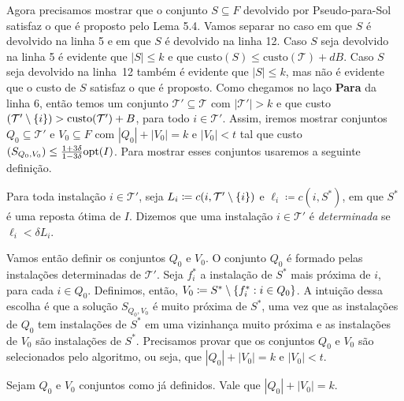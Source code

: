 Agora precisamos mostrar que o conjunto $S \subseteq F$ devolvido por {\sc Pseudo-para-Sol} satisfaz o que é proposto pelo Lema 5.4. Vamos separar no caso em que $S$ é devolvido na linha 5 e em que $S$ é devolvido na linha 12. Caso $S$ seja devolvido na linha 5 é evidente que $|S| \leq k$ e que custo$(S) \leq \text{custo}(\mathcal{T}) + dB$. Caso $S$ seja devolvido na linha~12 também é evidente que $|S| \leq k$, mas não é evidente que o custo de $S$ satisfaz o que é proposto. Como chegamos no laço {\bf Para} da linha 6, então temos um conjunto $\mathcal{T}' \subseteq \mathcal{T}$ com $|\mathcal{T}'| > k$ e que custo$(\mathcal{T}' \setminus \{i\}) > \text{custo}(\mathcal{T}') + B$, para todo $i \in \mathcal{T}'$.  Assim, iremos mostrar conjuntos $Q_0 \subseteq \mathcal{T}'$ e $V_0 \subseteq F$ com $|Q_0| + |V_0| = k$ e $|V_0| < t$ tal que custo$(S_{Q_0,V_0}) \leq \frac{1+3\delta}{1-3\delta}\mathrm{opt}(I)$.
Para mostrar esses conjuntos usaremos a seguinte definição.
\begin{definition}
    Para toda instalação $i \in \mathcal{T}'$, seja $L_i \coloneqq c(i,\mathcal{T}' \setminus \{i\})$ e $\ell_i \coloneqq c(i,S^*)$, em que $S^*$ é uma reposta ótima de $I$. Dizemos que uma instalação $i \in \mathcal{T}'$ é \emph{determinada} se $\ell_i < \delta L_i$.
\end{definition}
Vamos então definir os conjuntos $Q_0$ e $V_0$. O conjunto $Q_0$ é formado pelas instalações determinadas de $\mathcal{T}'$. Seja $f_i^*$ a instalação de $S^*$ mais próxima de $i$, para cada $i \in Q_0$. Definimos, então, $V_0 \coloneqq S^* \setminus \{f_i^* : i\in Q_0\}$. A intuição dessa escolha é que a solução $S_{Q_0,V_0}$ é muito próxima de $S^*$, uma vez que as instalações de $Q_0$ tem instalações de $S^*$ em uma vizinhança muito próxima e as instalações de $V_0$ são instalações de $S^*$. Precisamos provar que os conjuntos $Q_0$ e $V_0$ são selecionados pelo algoritmo, ou seja, que $|Q_0| + |V_0| = k$ e $|V_0| < t$.

\begin{lemma}
    Sejam $Q_0$ e $V_0$ conjuntos como já definidos. Vale que ${|Q_0| + |V_0| = k}$.
\end{lemma}

